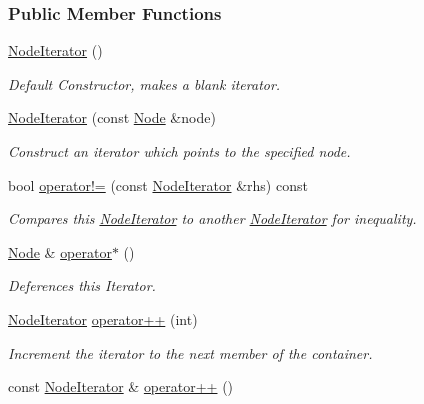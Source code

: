 \subsubsection*{Public Member Functions}
\begin{DoxyCompactItemize}
\item 
\hypertarget{classphys_1_1xml_1_1NodeIterator_af4558d54684f8ff49b88396f2d0fecd6}{
\hyperlink{classphys_1_1xml_1_1NodeIterator_af4558d54684f8ff49b88396f2d0fecd6}{NodeIterator} ()}
\label{classphys_1_1xml_1_1NodeIterator_af4558d54684f8ff49b88396f2d0fecd6}

\begin{DoxyCompactList}\small\item\em Default Constructor, makes a blank iterator. \item\end{DoxyCompactList}\item 
\hyperlink{classphys_1_1xml_1_1NodeIterator_abb8a4e6882e921fa57e309c28a5f7fe9}{NodeIterator} (const \hyperlink{classphys_1_1xml_1_1Node}{Node} \&node)
\begin{DoxyCompactList}\small\item\em Construct an iterator which points to the specified node. \item\end{DoxyCompactList}\item 
bool \hyperlink{classphys_1_1xml_1_1NodeIterator_a357923a57edc54937743fb865be7c3b3}{operator!=} (const \hyperlink{classphys_1_1xml_1_1NodeIterator}{NodeIterator} \&rhs) const 
\begin{DoxyCompactList}\small\item\em Compares this \hyperlink{classphys_1_1xml_1_1NodeIterator}{NodeIterator} to another \hyperlink{classphys_1_1xml_1_1NodeIterator}{NodeIterator} for inequality. \item\end{DoxyCompactList}\item 
\hyperlink{classphys_1_1xml_1_1Node}{Node} \& \hyperlink{classphys_1_1xml_1_1NodeIterator_a3af8dd5a0b7b4c42cad57589ae3feb48}{operator$\ast$} ()
\begin{DoxyCompactList}\small\item\em Deferences this Iterator. \item\end{DoxyCompactList}\item 
\hyperlink{classphys_1_1xml_1_1NodeIterator}{NodeIterator} \hyperlink{classphys_1_1xml_1_1NodeIterator_a3c0b341d6b90e9607bb6b3ae8f6dbfbf}{operator++} (int)
\begin{DoxyCompactList}\small\item\em Increment the iterator to the next member of the container. \item\end{DoxyCompactList}\item 
\hypertarget{classphys_1_1xml_1_1NodeIterator_afeef29c3850b37585507873a2a076d8c}{
const \hyperlink{classphys_1_1xml_1_1NodeIterator}{NodeIterator} \& \hyperlink{classphys_1_1xml_1_1NodeIterator_afeef29c3850b37585507873a2a076d8c}{operator++} ()}
\label{classphys_1_1xml_1_1NodeIterator_afeef29c3850b37585507873a2a076d8c}


\end{DoxyCompactItemize}
